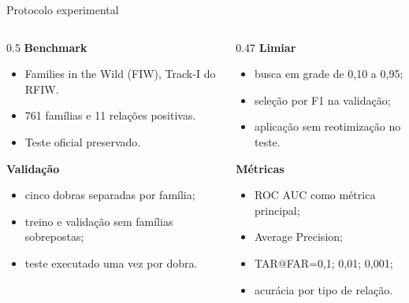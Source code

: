 \documentclass[aspectratio=169,10pt]{beamer}
\begin{document}
\begin{frame}{Protocolo experimental}
  \begin{columns}[T,onlytextwidth]
    \begin{column}{0.5\textwidth}
      \textbf{Benchmark}
      \begin{itemize}
        \item Families in the Wild (FIW), Track-I do RFIW.
        \item 761 famílias e 11 relações positivas.
        \item Teste oficial preservado.
      \end{itemize}

      \vspace{0.25cm}
      \textbf{Validação}
      \begin{itemize}
        \item cinco dobras separadas por família;
        \item treino e validação sem famílias sobrepostas;
        \item teste executado uma vez por dobra.
      \end{itemize}
    \end{column}
    \begin{column}{0.47\textwidth}
      \textbf{Limiar}
      \begin{itemize}
        \item busca em grade de 0,10 a 0,95;
        \item seleção por F1 na validação;
        \item aplicação sem reotimização no teste.
      \end{itemize}

      \vspace{0.25cm}
      \textbf{Métricas}
      \begin{itemize}
        \item ROC AUC como métrica principal;
        \item Average Precision;
        \item TAR@FAR=0,1; 0,01; 0,001;
        \item acurácia por tipo de relação.
      \end{itemize}
    \end{column}
  \end{columns}
\end{frame}
\end{document}
